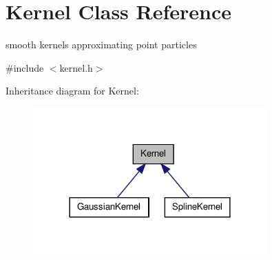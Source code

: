 \hypertarget{classKernel}{\section{\-Kernel \-Class \-Reference}
\label{classKernel}
}


smooth kernels approximating point particles  




{\ttfamily \#include $<$kernel.\-h$>$}



\-Inheritance diagram for \-Kernel\-:\nopagebreak
\begin{figure}[H]
\begin{center}
\leavevmode
\includegraphics[width=254pt]{classKernel__inherit__graph}
\end{center}
\end{figure}
